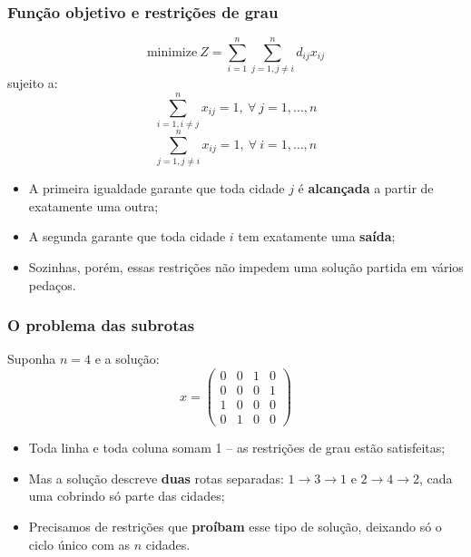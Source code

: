 \documentclass[fleqn]{beamer}
\begin{document}
\begin{frame}
	\frametitle{Função objetivo e restrições de grau}
	$$
		\text{minimize}~Z = \sum_{i=1}^{n}\sum_{j=1,j\neq i}^{n} d_{ij}x_{ij}
	$$
	sujeito a:
	$$
		\sum_{i=1,i\neq j}^{n} x_{ij} = 1,~\forall~j = 1,\ldots,n
	$$
	$$
		\sum_{j=1,j\neq i}^{n} x_{ij} = 1,~\forall~i = 1,\ldots,n
	$$
	\begin{itemize}
		\item A primeira igualdade garante que toda cidade $j$ é
			\textbf{alcançada} a partir de exatamente uma outra;
		\item A segunda garante que toda cidade $i$ tem exatamente uma
			\textbf{saída};
		\item Sozinhas, porém, essas restrições não impedem uma solução
			partida em vários pedaços.
	\end{itemize}
\end{frame}

\begin{frame}
	\frametitle{O problema das subrotas}
	Suponha $n=4$ e a solução:
	$$
		x = \begin{pmatrix}
			0 & 0 & 1 & 0 \\
			0 & 0 & 0 & 1 \\
			1 & 0 & 0 & 0 \\
			0 & 1 & 0 & 0
		\end{pmatrix}
	$$
	\begin{itemize}
		\item Toda linha e toda coluna somam 1 -- as restrições de grau
			estão satisfeitas;
		\item Mas a solução descreve \textbf{duas} rotas separadas: $1
			\to 3 \to 1$ e $2 \to 4 \to 2$, cada uma cobrindo só parte das
			cidades;
		\item Precisamos de restrições que \textbf{proíbam} esse tipo de
			solução, deixando só o ciclo único com as $n$ cidades.
	\end{itemize}
\end{frame}
\end{document}
